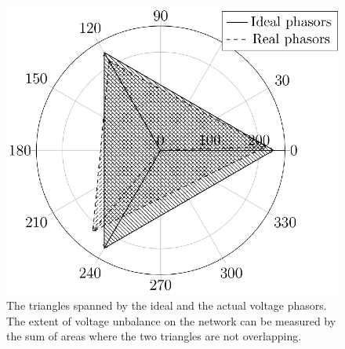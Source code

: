             \begin{figure}[!ht]
           \centering
           \includegraphics[scale=0.95]{Unblance_EPS_Pics/UnbalRedComp_JCP-figure1.eps}
%
%
%
%
%
%

           \caption{The triangles spanned by the ideal and the actual voltage phasors. The extent of voltage unbalance on the network can be measured by the sum of areas where the two triangles are not overlapping.}
           \label{fig:threephase}
            \end{figure}



